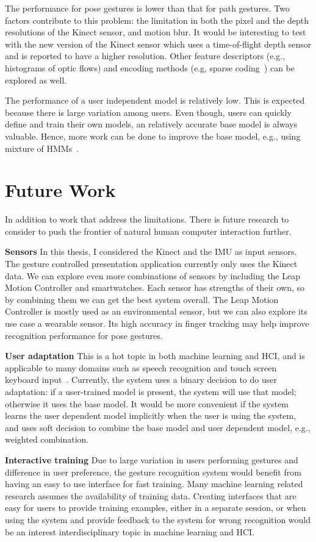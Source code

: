 The performance for pose gestures is lower than that
for path gestures. Two factors contribute to this problem: the limitation in
both the pixel and the depth resolutions of the Kinect sensor, and motion blur.
It would be interesting to test with the new version of the Kinect sensor which
uses a time-of-flight depth sensor and is reported to have a higher resolution. Other feature descriptors
(e.g., histograms of optic flows) and encoding methods (e.g, sparse
coding~\cite{lee07}) can be explored as well.

The performance of a user independent model is relatively low. This is expected
because there is large variation among users. Even though, users can
quickly define and train their own models, an relatively accurate base
model is always valuable. Hence, more work can be done to improve the base
model, e.g., using mixture of HMMs~\cite{keskin12}.

\section{Future Work}
In addition to work that address the limitations. There is future research to
consider to push the frontier of natural human computer interaction further.

\textbf{Sensors} In this thesis, I considered the Kinect and the IMU as
input sensors. The gesture controlled presentation application currently
only uses the Kinect data. We can explore even more combinations of sensors
by including the Leap Motion Controller and smartwatches. Each sensor has
strengths of their own, so by combining them we can get the best system
overall. The Leap Motion Controller is mostly used as an environmental sensor,
but we can also explore its use case a wearable sensor. Its high accuracy in
finger tracking may help improve recognition performance for pose gestures.

\textbf{User adaptation} This is a hot topic in both machine learning and
HCI, and is applicable to many domains such as speech recognition and
touch screen keyboard input~\cite{yin13-making}. Currently, the system
uses a binary decision to do user adaptation: if a user-trained model is
present, the system will use that model; otherwise it uses the base
model. It would be more convenient if the system learns the user
dependent model implicitly when the user is using the system, and uses
soft decision to combine the base model and user dependent model, e.g., weighted
combination.

\textbf{Interactive training} Due to large variation in users performing
gestures and difference in user preference, the gesture recognition system would
benefit from having an easy to use interface for fast training. Many machine
learning related research assumes the availability of training data. Creating
interfaces that are easy for users to provide training examples, either in a
separate session, or when using the system and provide feedback to the system
for wrong recognition would be an interest interdisciplinary topic in machine
learning and HCI.
